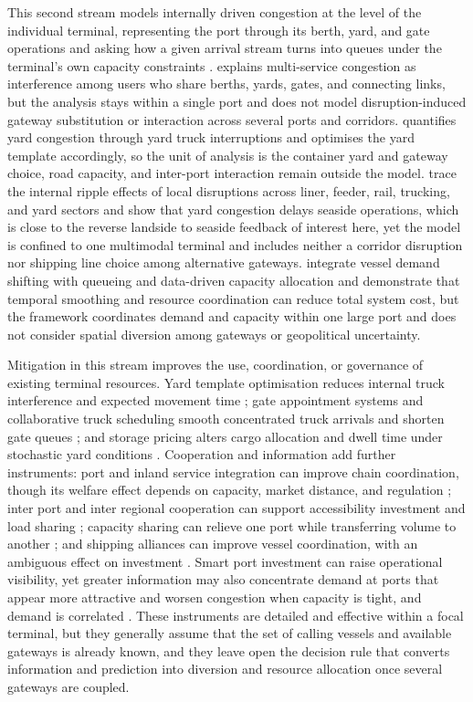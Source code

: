 \documentclass[a4paper,fleqn]{cas-sc}
\begin{document}
This second stream models internally driven congestion at the level of the individual terminal, representing the port through its berth, yard, and gate operations and asking how a given arrival stream turns into queues under the terminal's own capacity constraints \citep{AlvarezEtAl2015,LeiJia2026}. \citet{TalleyNg2016} explains multi-service congestion as interference among users who share berths, yards, gates, and connecting links, but the analysis stays within a single port and does not model disruption-induced gateway substitution or interaction across several ports and corridors. \citet{Zhen2016} quantifies yard congestion through yard truck interruptions and optimises the yard template accordingly, so the unit of analysis is the container yard and gateway choice, road capacity, and inter-port interaction remain outside the model. \citet{ZhangEtAl2025} trace the internal ripple effects of local disruptions across liner, feeder, rail, trucking, and yard sectors and show that yard congestion delays seaside operations, which is close to the reverse landside to seaside feedback of interest here, yet the model is confined to one multimodal terminal and includes neither a corridor disruption nor shipping line choice among alternative gateways. \citet{LeiJia2026} integrate vessel demand shifting with queueing and data-driven capacity allocation and demonstrate that temporal smoothing and resource coordination can reduce total system cost, but the framework coordinates demand and capacity within one large port and does not consider spatial diversion among gateways or geopolitical uncertainty.

Mitigation in this stream improves the use, coordination, or governance of existing terminal resources. Yard template optimisation reduces internal truck interference and expected movement time \citep{Zhen2016}; gate appointment systems and collaborative truck scheduling smooth concentrated truck arrivals and shorten gate queues \citep{GiulianoOBrien2007,PhanKim2015,PhanKim2016}; and storage pricing alters cargo allocation and dwell time under stochastic yard conditions \citep{MartinEtAl2014,WangEtAl2020}. Cooperation and information add further instruments: port and inland service integration can improve chain coordination, though its welfare effect depends on capacity, market distance, and regulation \citep{AlvarezEtAl2015}; inter port and inter regional cooperation can support accessibility investment and load sharing \citep{WanEtAl2016,LuEtAl2024}; capacity sharing can relieve one port while transferring volume to another \citep{LyuYang2026}; and shipping alliances can improve vessel coordination, with an ambiguous effect on investment \citep{ShangEtAl2026}. Smart port investment can raise operational visibility, yet greater information may also concentrate demand at ports that appear more attractive and worsen congestion when capacity is tight, and demand is correlated \citep{NiuEtAl2024,NiuEtAl2026}. These instruments are detailed and effective within a focal terminal, but they generally assume that the set of calling vessels and available gateways is already known, and they leave open the decision rule that converts information and prediction into diversion and resource allocation once several gateways are coupled.
\end{document}
